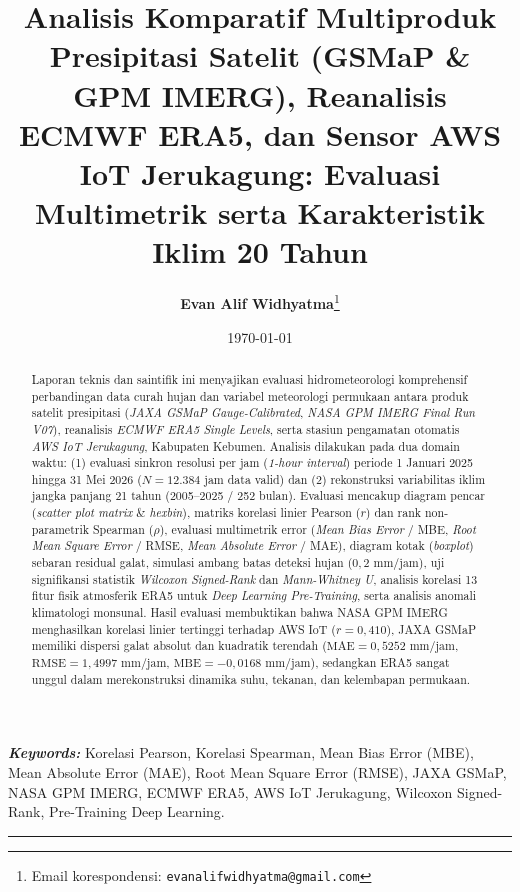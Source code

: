 \documentclass[11pt,a4paper]{article}
\title{\vspace{-1.2cm}\textbf{\Large Analisis Komparatif Multiproduk Presipitasi Satelit (GSMaP \& GPM IMERG), Reanalisis ECMWF ERA5, dan Sensor AWS IoT Jerukagung: Evaluasi Multimetrik serta Karakteristik Iklim 20 Tahun}}
\author[1]{\textbf{Evan Alif Widhyatma}\thanks{Email korespondensi: \texttt{evanalifwidhyatma@gmail.com}}}
\affil[1]{\small Program Studi Sains Data, Universitas Putra Bangsa}
\date{\small\today}
\begin{document}
\maketitle

\begin{abstract}
\noindent Laporan teknis dan saintifik ini menyajikan evaluasi hidrometeorologi komprehensif perbandingan data curah hujan dan variabel meteorologi permukaan antara produk satelit presipitasi (\textit{JAXA GSMaP Gauge-Calibrated}, \textit{NASA GPM IMERG Final Run V07}), reanalisis \textit{ECMWF ERA5 Single Levels}, serta stasiun pengamatan otomatis \textit{AWS IoT Jerukagung}, Kabupaten Kebumen. Analisis dilakukan pada dua domain waktu: (1) evaluasi sinkron resolusi per jam (\textit{1-hour interval}) periode 1 Januari 2025 hingga 31 Mei 2026 ($N = 12.384$ jam data valid) dan (2) rekonstruksi variabilitas iklim jangka panjang 21 tahun (2005--2025 / 252 bulan). Evaluasi mencakup diagram pencar (\textit{scatter plot matrix} \& \textit{hexbin}), matriks korelasi linier Pearson ($r$) dan rank non-parametrik Spearman ($\rho$), evaluasi multimetrik error (\textit{Mean Bias Error} / MBE, \textit{Root Mean Square Error} / RMSE, \textit{Mean Absolute Error} / MAE), diagram kotak (\textit{boxplot}) sebaran residual galat, simulasi ambang batas deteksi hujan ($0{,}2\text{ mm/jam}$), uji signifikansi statistik \textit{Wilcoxon Signed-Rank} dan \textit{Mann-Whitney U}, analisis korelasi 13 fitur fisik atmosferik ERA5 untuk \textit{Deep Learning Pre-Training}, serta analisis anomali klimatologi monsunal. Hasil evaluasi membuktikan bahwa NASA GPM IMERG menghasilkan korelasi linier tertinggi terhadap AWS IoT ($r = 0{,}410$), JAXA GSMaP memiliki dispersi galat absolut dan kuadratik terendah ($\text{MAE} = 0{,}5252\text{ mm/jam}$, $\text{RMSE} = 1{,}4997\text{ mm/jam}$, $\text{MBE} = -0{,}0168\text{ mm/jam}$), sedangkan ERA5 sangat unggul dalam merekonstruksi dinamika suhu, tekanan, dan kelembapan permukaan.
\end{abstract}

\vspace{0.2cm}
\noindent\textbf{\textit{Keywords:}} Korelasi Pearson, Korelasi Spearman, Mean Bias Error (MBE), Mean Absolute Error (MAE), Root Mean Square Error (RMSE), JAXA GSMaP, NASA GPM IMERG, ECMWF ERA5, AWS IoT Jerukagung, Wilcoxon Signed-Rank, Pre-Training Deep Learning.

\vspace{0.4cm}
\hrule
\vspace{0.4cm}
\end{document}
